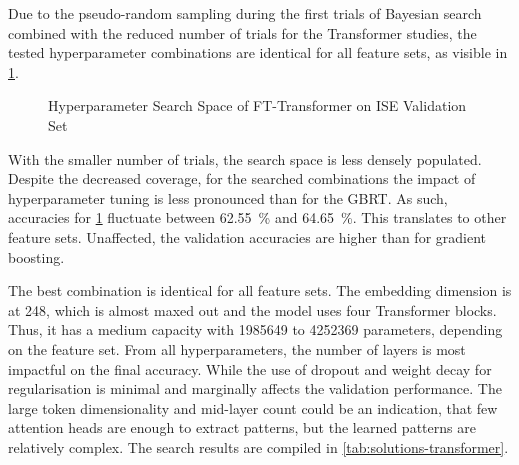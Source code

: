 
Due to the pseudo-random sampling during the first trials of Bayesian search combined with the reduced number of trials for the Transformer studies, the tested hyperparameter combinations are identical for all feature sets, as visible in \cref{fig:ise-transformer-hyperparam}.


\begin{figure}[!h]
    \vfill
\end{figure}
\clearpage
\begin{figure}[!ht]
    \addtocounter{figure}{-1}
    \caption[Hyperparameter Search Space of FT-Transformer]{Hyperparameter Search Space of FT-Transformer on \gls{ISE} Validation Set}
    \label{fig:ise-transformer-hyperparam}
\end{figure}

With the smaller number of trials, the search space is less densely populated. Despite the decreased coverage, for the searched combinations the impact of hyperparameter tuning is less pronounced than for the \gls{GBRT}. As such, accuracies for \cref{fig:ise-transformer-hyperparam} fluctuate between \SI{62.55}{\percent} and \SI{64.65}{\percent}. This translates to other feature sets. Unaffected, the validation accuracies are higher than for gradient boosting.

The best combination is identical for all feature sets. The embedding dimension is at \num{248}, which is almost maxed out and the model uses four Transformer blocks. Thus, it has a medium capacity with \num{1985649} to \num{4252369} parameters, depending on the feature set. From all hyperparameters, the number of layers is most impactful on the final accuracy. While the use of dropout and weight decay for regularisation is minimal and marginally affects the validation performance. The large token dimensionality and mid-layer count could be an indication, that few attention heads are enough to extract patterns, but the learned patterns are relatively complex. The search results are compiled in \cref{tab:solutions-transformer}.

